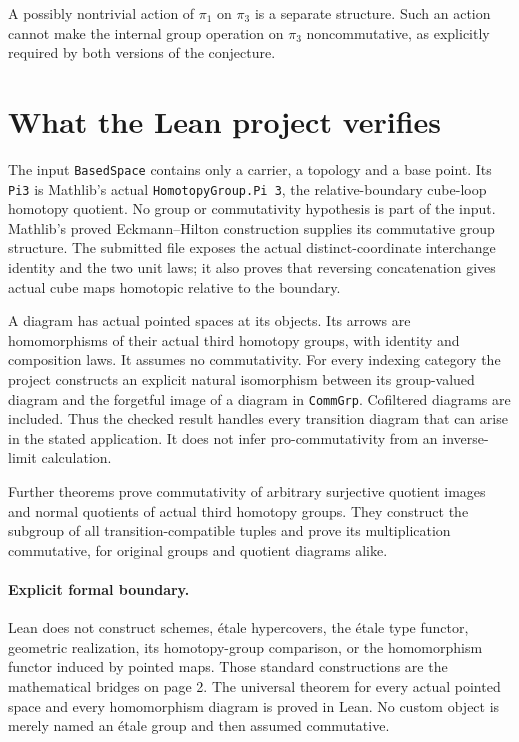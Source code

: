 \documentclass[11pt]{article}
\begin{document}
A possibly nontrivial action of $\pi_1$ on $\pi_3$ is a separate
structure. Such an action cannot make the internal group
operation on $\pi_3$ noncommutative, as explicitly required by
both versions of the conjecture.

\newpage
\section*{What the Lean project verifies}
The input \texttt{BasedSpace} contains only a carrier, a topology
and a base point. Its \texttt{Pi3} is Mathlib's actual
\texttt{HomotopyGroup.Pi 3}, the relative-boundary cube-loop
homotopy quotient. No group or commutativity hypothesis is part
of the input. Mathlib's proved Eckmann--Hilton construction
supplies its commutative group structure. The submitted file
exposes the actual distinct-coordinate interchange identity and
the two unit laws; it also proves that reversing concatenation
gives actual cube maps homotopic relative to the boundary.

A diagram has actual pointed spaces at its objects. Its arrows
are homomorphisms of their actual third homotopy groups, with
identity and composition laws. It assumes
no commutativity. For every indexing category the project
constructs an explicit natural isomorphism between its
group-valued diagram and the forgetful image of a diagram in
\texttt{CommGrp}. Cofiltered diagrams are included. Thus the
checked result handles every transition diagram that can arise
in the stated application. It does not infer pro-commutativity
from an inverse-limit calculation.

Further theorems prove commutativity of arbitrary surjective
quotient images and normal quotients of actual third homotopy
groups. They construct the subgroup of all transition-compatible
tuples and prove its multiplication commutative, for original
groups and quotient diagrams alike.

\paragraph{Explicit formal boundary.}
Lean does not construct schemes, \'etale hypercovers, the \'etale
type functor, geometric realization, its homotopy-group comparison,
or the homomorphism functor induced by pointed maps. Those standard
constructions are the mathematical bridges on page 2. The
universal theorem for every actual pointed space and every
homomorphism diagram is proved in Lean. No custom object is
merely named an \'etale group and then assumed commutative.
\end{document}
